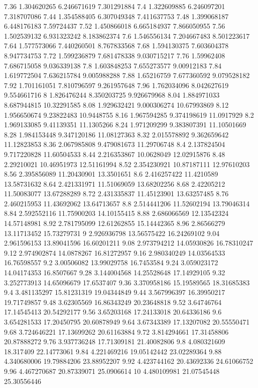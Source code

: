 {7.36 1.304620265 6.246671619 7.301291884
7.4 1.322609885 6.246097201 7.318707086
7.44 1.354588405 6.307049348 7.411637753
7.48 1.399068187 6.448176183 7.59724437
7.52 1.450866018 6.665184937 7.866050955
7.56 1.502539132 6.931323242 8.183862374
7.6 1.546556134 7.204667483 8.501223617
7.64 1.577573066 7.440260501 8.767833568
7.68 1.594130375 7.603604378 8.947734753
7.72 1.599236879 7.681478338 9.030715217
7.76 1.59962408 7.686715058 9.036339138
7.8 1.603848253 7.655273577 9.00912183
7.84 1.619772504 7.636215784 9.005988288
7.88 1.65216759 7.677360592 9.079528182
7.92 1.701161051 7.810796597 9.261957648
7.96 1.762034096 8.042627619 9.554661716
8 1.826476244 8.350203725 9.926679968
8.04 1.884971033 8.687944815 10.32291585
8.08 1.929632421 9.000306274 10.67993869
8.12 1.956650674 9.23822483 10.9448755
8.16 1.967594285 9.374198619 11.0917929
8.2 1.969133085 9.41139351 11.1305266
8.24 1.971209299 9.383807391 11.10501669
8.28 1.984153448 9.347120186 11.08127363
8.32 2.015578892 9.362659642 11.12823853
8.36 2.067985808 9.479081673 11.29706748
8.4 2.137824504 9.717220828 11.60504533
8.44 2.216353867 10.0628049 12.02915876
8.48 2.29210021 10.46951973 12.51161994
8.52 2.354230921 10.87187111 12.97610203
8.56 2.395856089 11.20430901 13.3501651
8.6 2.416257422 11.4210589 13.58731632
8.64 2.421331971 11.51069059 13.68202256
8.68 2.42205212 11.50083077 13.67288289
8.72 2.431335837 11.45123901 13.63257485
8.76 2.460215953 11.43692062 13.64713657
8.8 2.514441206 11.52602194 13.79046314
8.84 2.592552116 11.75900203 14.10155415
8.88 2.686066569 12.13542324 14.57148981
8.92 2.781795099 12.61262855 15.14442365
8.96 2.86566279 13.11713452 15.73279731
9 2.926936798 13.56575422 16.24269102
9.04 2.961596153 13.89041596 16.60201211
9.08 2.973794212 14.05930826 16.78310247
9.12 2.974902874 14.0878267 16.81272957
9.16 2.980340249 14.03564533 16.76598557
9.2 3.00506082 13.99029758 16.7453584
9.24 3.059023172 14.04174353 16.8507667
9.28 3.144004568 14.25528648 17.14929105
9.32 3.252773913 14.65096679 17.6537407
9.36 3.370958186 15.19589565 18.31685383
9.4 3.481135297 15.81231319 19.04344849
9.44 3.567996397 16.39950217 19.71749857
9.48 3.62305569 16.86343249 20.23648818
9.52 3.64746764 17.14545413 20.54292177
9.56 3.65203168 17.24133018 20.64336186
9.6 3.654281533 17.20450795 20.60878949
9.64 3.67343389 17.13207082 20.55550471
9.68 3.724646221 17.13699262 20.61163884
9.72 3.814294661 17.31458806 20.87888272
9.76 3.937736248 17.71309181 21.40082806
9.8 4.080321609 18.317409 22.14773061
9.84 4.221469216 19.05142442 23.02289364
9.88 4.340680006 19.79884206 23.88952207
9.92 4.423744162 20.43692336 24.61066752
9.96 4.467270687 20.87339071 25.0906614
10 4.480109981 21.07545448 25.30556446
}\signedevent
